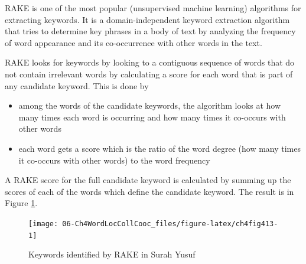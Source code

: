 \documentclass[
]{article}
\newenvironment{Shaded}{\begin{snugshade}}{\end{snugshade}}
\newcommand{\AttributeTok}[1]{\textcolor[rgb]{0.13,0.29,0.53}{#1}}
\newcommand{\FunctionTok}[1]{\textcolor[rgb]{0.13,0.29,0.53}{\textbf{#1}}}
\newcommand{\NormalTok}[1]{#1}
\newcommand{\OtherTok}[1]{\textcolor[rgb]{0.56,0.35,0.01}{#1}}
\newcommand{\SpecialCharTok}[1]{\textcolor[rgb]{0.81,0.36,0.00}{\textbf{#1}}}
\newcommand{\StringTok}[1]{\textcolor[rgb]{0.31,0.60,0.02}{#1}}
\providecommand{\tightlist}{%
  \setlength{\itemsep}{0pt}\setlength{\parskip}{0pt}}
\begin{document}
RAKE is one of the most popular (unsupervised machine learning) algorithms for extracting keywords. It is a domain-independent keyword extraction algorithm that tries to determine key phrases in a body of text by analyzing the frequency of word appearance and its co-occurrence with other words in the text.

RAKE looks for keywords by looking to a contiguous sequence of words that do not contain irrelevant words by calculating a score for each word that is part of any candidate keyword. This is done by

\begin{itemize}
\tightlist
\item
  among the words of the candidate keywords, the algorithm looks at how many times each word is occurring and how many times it co-occurs with other words
\item
  each word gets a score which is the ratio of the word degree (how many times it co-occurs with other words) to the word frequency
\end{itemize}

A RAKE score for the full candidate keyword is calculated by summing up the scores of each of the words which define the candidate keyword. The result is in Figure \ref{fig:ch4fig413}.

\begin{Shaded}
\end{Shaded}

\begin{figure}

{\centering \texttt{[image: 06-Ch4WordLocCollCooc\_files/figure-latex/ch4fig413-1]} 

}

\caption{Keywords identified by RAKE in Surah Yusuf}\label{fig:ch4fig413}
\end{figure}
\end{document}
